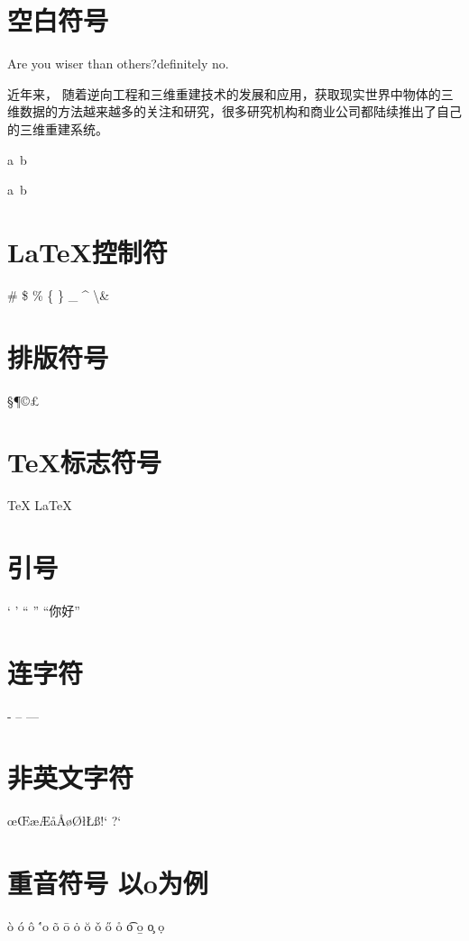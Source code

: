 \documentclass{article}
\begin{document}
	\section{空白符号}
		Are you wiser          than others?definitely no.
		
		近年来，                随着逆向工程和三维重建技术的发展和应用，获取现实世界中物体的三维数据的方法越来越多的关注和研究，很多研究机构和商业公司都陆续推出了自己的三维重建系统。
		
	a\ b
	
	a~b	
	
	\section{\LaTeX 控制符}
	\#	\$	\%	\{	\}	\_{}	\^{}	\textbackslash	\&
	
	\section{排版符号}
	\S \P \dag \ddag \copyright	\pounds
	
	\section{\TeX 标志符号}
	\TeX{}	\LaTeX{}	\LaTeXe{}
	
	\section{引号}
	` ' `` '' 	``你好''
	
	\section{连字符}
	- -- ---
	
	\section{非英文字符}
	\oe \OE \ae \AE \aa \AA \o \O \l \L \ss \SS !` ?`
	
	\section{重音符号 以o为例}
	\`o \'o \^o \''o \~o \=o \.o \u{o} \v{o} \H{o} \r{o} \t{o} 
	\b{o} \c{o} \d{o}
	
\end{document}

